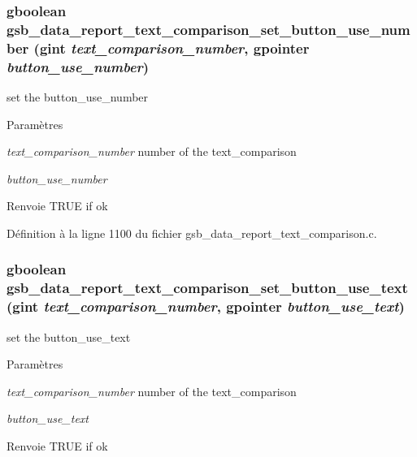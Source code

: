 \subsubsection[{gsb\_\-data\_\-report\_\-text\_\-comparison\_\-set\_\-button\_\-use\_\-number}]{\setlength{\rightskip}{0pt plus 5cm}gboolean gsb\_\-data\_\-report\_\-text\_\-comparison\_\-set\_\-button\_\-use\_\-number (gint {\em text\_\-comparison\_\-number}, \/  gpointer {\em button\_\-use\_\-number})}\label{gsb__data__report__text__comparison_8c_a80d0fb29d16d8710ee68066879f0218c}
set the button\_\-use\_\-number


\begin{DoxyParams}{Paramètres}
\item[{\em text\_\-comparison\_\-number}]number of the text\_\-comparison \item[{\em button\_\-use\_\-number}]\end{DoxyParams}
\begin{DoxyReturn}{Renvoie}
TRUE if ok 
\end{DoxyReturn}


Définition à la ligne 1100 du fichier gsb\_\-data\_\-report\_\-text\_\-comparison.c.

\subsubsection[{gsb\_\-data\_\-report\_\-text\_\-comparison\_\-set\_\-button\_\-use\_\-text}]{\setlength{\rightskip}{0pt plus 5cm}gboolean gsb\_\-data\_\-report\_\-text\_\-comparison\_\-set\_\-button\_\-use\_\-text (gint {\em text\_\-comparison\_\-number}, \/  gpointer {\em button\_\-use\_\-text})}\label{gsb__data__report__text__comparison_8c_a609be69e50d2b077d9833579484f56dd}
set the button\_\-use\_\-text


\begin{DoxyParams}{Paramètres}
\item[{\em text\_\-comparison\_\-number}]number of the text\_\-comparison \item[{\em button\_\-use\_\-text}]\end{DoxyParams}
\begin{DoxyReturn}{Renvoie}
TRUE if ok 
\end{DoxyReturn}


